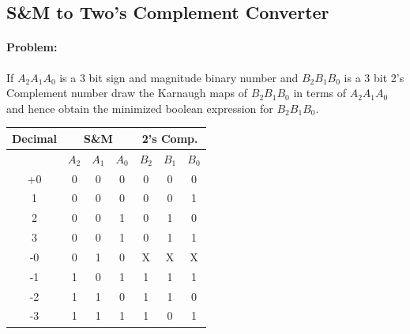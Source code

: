 \documentclass[12pt, a4paper]{report}
\newcommand{\implicant}[4][0]{
	\draw[rounded corners=3pt, fill=#4, opacity=0.3] ($(#2.north west)+(135:#1)$) rectangle ($(#3.south east)+(-45:#1)$);
}
\newenvironment{24kmap}[2]%
{
	\begin{tikzpicture}[baseline=(current bounding box.north),scale=0.8]
		\draw (0,0) grid (4,2);
		\draw (0,2) -- node [pos=0.7,above right,anchor=south west] {\tiny{#1}} node [pos=0.7,below left,anchor=north east] {\tiny{#2}} ++(135:1);
		\matrix (mapa) [matrix of nodes,
		column sep={0.8cm,between origins},
		row sep={0.8cm,between origins},
		every node/.style={minimum size=0.3mm},
		anchor=4.center,
		ampersand replacement=\&] at (0.5,0.5)
		{
			\& |(c00)| 00         \& |(c01)| 01         \& |(c11)| 11         \& |(c10)| 10         \& |(cf)| \phantom{00} \\
			|(r00)| 0             \& |(0)|  \phantom{0} \& |(1)|  \phantom{0} \& |(3)|  \phantom{0} \& |(2)|  \phantom{0} \&                     \\
			|(r01)| 1             \& |(4)|  \phantom{0} \& |(5)|  \phantom{0} \& |(7)|  \phantom{0} \& |(6)|  \phantom{0} \&                     \\
			|(rf) | \phantom{00}  \&                    \&                    \&                    \&                    \&                     \\
		};
	}%
	{
	\end{tikzpicture}
}
\newcommand{\contingut}[1]{%
	\foreach \x [count=\xi from 0]  in {#1}
	\path (\xi) node {\x};
}
\begin{document}
\subsection{S\&M to Two's Complement Converter}
\paragraph{Problem: }If $A_2A_1A_0$ is a 3 bit sign and magnitude binary number and $B_2B_1B_0$ is a 3 bit 2's Complement number draw the Karnaugh maps of $B_2B_1B_0$ in terms of $A_2A_1A_0$ and hence obtain the minimized boolean expression for  $B_2B_1B_0$.

\begin{center}
\begin{tabular}{c|c|c|c||c|c|c}
	Decimal & \multicolumn{3}{c||}{S\&M} & \multicolumn{3}{c}{2's Comp.} \\ \hline
	& $A_2$   & $A_1$  & $A_0$  & $B_2$    & $B_1$    & $B_0$    \\ \hline
	+0      & 0       & 0      & 0      & 0        & 0        & 0        \\ \hline
	1       & 0       & 0      & 0      & 0        & 0        & 1        \\ \hline
	2       & 0       & 0      & 1      & 0        & 1        & 0        \\ \hline
	3       & 0       & 0      & 1      & 0        & 1        & 1        \\ \hline
	-0      & 0       & 1      & 0      & X        & X        & X        \\ \hline
	-1      & 1       & 0      & 1      & 1        & 1        & 1        \\ \hline
	-2      & 1       & 1      & 0      & 1        & 1        & 0        \\ \hline
	-3      & 1       & 1      & 1      & 1        & 0        & 1       
\end{tabular}
\end{center}~\\
\newpage
\end{document}
